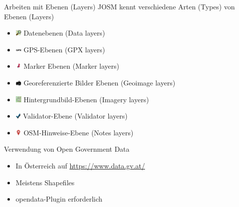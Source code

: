 \documentclass{beamer}
\begin{document}
\begin{frame}[fragile]{Arbeiten mit Ebenen (Layers)}
JOSM kennt verschiedene Arten (Types) von Ebenen (Layers)
\begin{itemize}
  \item \includegraphics[height=0.8em]{data}\hspace{0.2em} Datenebenen (Data layers)
  \item \includegraphics[height=0.8em]{gpx}\hspace{0.2em} GPS-Ebenen (GPX layers)
  \item \includegraphics[height=0.8em]{marker}\hspace{0.2em} Marker Ebenen (Marker layers)
  \item \includegraphics[height=0.8em]{geoimage}\hspace{0.2em} Georeferenzierte Bilder Ebenen (Geoimage layers)
  \item \includegraphics[height=0.8em]{imagery}\hspace{0.2em} Hintergrundbild-Ebenen (Imagery layers)
  \item \includegraphics[height=0.8em]{validator}\hspace{0.2em} Validator-Ebene (Validator layers)
  \item \includegraphics[height=0.8em]{note}\hspace{0.2em} OSM-Hinweise-Ebene (Notes layers)
\end{itemize}
\end{frame}

\begin{frame}{Verwendung von Open Government Data}
\begin{itemize}
  \item In Österreich auf \url{https://www.data.gv.at/}  
  \item Meistens Shapefiles
  \item opendata-Plugin erforderlich
\end{itemize}
\end{frame}
\end{document}
